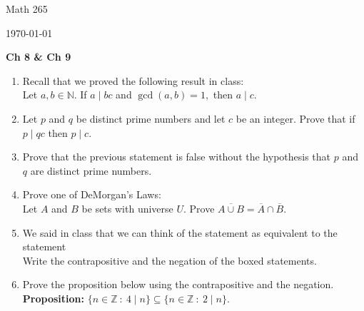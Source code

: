 \documentclass[11pt]{report}
\theoremstyle{plain}
\begin{document}
\hfill Math 265

\hfill \today

\begin{center}
\Large{\textbf{Ch 8 \& Ch 9}} \\
\end{center}
\begin{enumerate}
\item Recall that we proved the following result in class:\\

Let $a,b \in \mathbb{N}.$ If $a \mid bc$ and $\gcd(a,b)=1,$ then $a \mid c.$\\

\item Let $p$ and $q$ be distinct prime numbers and let $c$ be an integer. Prove that if $p\mid qc$ then $p \mid c.$\\



\item Prove that the previous statement is false without the hypothesis that $p$ and $q$ are distinct prime numbers. \\



\item Prove one of DeMorgan's Laws:\\
Let $A$ and $B$ be sets with universe $U$. Prove $\overline{A \cup B} = \overline{A} \cap \overline{B}.$\\



\item We said in class that we can think of the statement  as equivalent to the statement \\

Write the contrapositive and the negation of the boxed statements.\\



\item Prove the proposition below using the contrapositive and the negation.\\

\textbf{Proposition:} $\{n \in \mathbb{Z} \: : \: 4\mid n \} \subseteq \{n \in \mathbb{Z} \: : \: 2\mid n\}.$\\


\end{enumerate}
\end{document}
